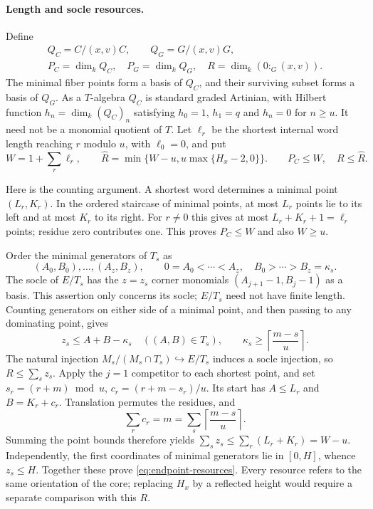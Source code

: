 \paragraph{Length and socle resources.}
Define
\[
 \begin{gathered}
 Q_C=C/(x,v)C,\qquad Q_G=G/(x,v)G,\\
 P_C=\dim_k Q_C,\quad P_G=\dim_k Q_G,\quad
 R=\dim_k(0:_G(x,v)).
 \end{gathered}
\]
The minimal fiber points form a basis of $Q_C$, and their surviving
subset forms a basis of $Q_G$. As a $T$-algebra $Q_C$ is standard graded
Artinian, with Hilbert function
$h_n=\dim_k(Q_C)_n$ satisfying $h_0=1$, $h_1=q$ and $h_n=0$ for
$n\ge u$. It need not be a monomial quotient of $T$.
Let $\ell_r$ be the shortest internal word length reaching $r$ modulo $u$,
with $\ell_0=0$, and put
\begin{equation}\label{eq:endpoint-resources}
 W=1+\sum_r\ell_r,\qquad
 \widehat R=\min\{W-u,u\max\{H_x-2,0\}\}.
 \qquad P_C\le W,\quad R\le\widehat R.
\end{equation}

Here is the counting argument. A shortest word determines a minimal
point $(L_r,K_r)$. In the ordered staircase of minimal points, at most
$L_r$ points lie to its left and at most $K_r$ to its right. For
$r\ne0$ this gives at most $L_r+K_r+1=\ell_r$ points; residue zero
contributes one. This proves $P_C\le W$ and also $W\ge u$.

Order the minimal generators of $T_s$ as
\[
 (A_0,B_0),\ldots,(A_z,B_z),\qquad
 0=A_0<\cdots<A_z,\quad B_0>\cdots>B_z=\kappa_s.
\]
The socle of $E/T_s$ has the $z=z_s$ corner monomials
$(A_{j+1}-1,B_j-1)$ as a basis. This assertion only concerns its socle;
$E/T_s$ need not have finite length. Counting generators on either side
of a minimal point, and then passing to any dominating point, gives
\[
 z_s\le A+B-\kappa_s\quad((A,B)\in T_s),\qquad
 \kappa_s\ge\left\lceil\frac{m-s}{u}\right\rceil.
\]
The natural injection $M_s/(M_s\cap T_s)\hookrightarrow E/T_s$ induces
a socle injection, so $R\le\sum_s z_s$.
Apply the $j=1$ competitor to each shortest point, and set
$s_r=(r+m)\bmod u$, $c_r=(r+m-s_r)/u$.
Its start has $A\le L_r$ and $B=K_r+c_r$.
Translation permutes the residues, and
\[
 \sum_r c_r=m=\sum_s\left\lceil\frac{m-s}{u}\right\rceil.
\]
Summing the point bounds therefore yields
$\sum_s z_s\le\sum_r(L_r+K_r)=W-u$.
Independently, the first coordinates of minimal generators lie in
$[0,H]$, whence $z_s\le H$. Together these prove
\eqref{eq:endpoint-resources}. Every resource refers to the same
orientation of the core; replacing $H_x$ by a reflected height would
require a separate comparison with this $R$.

